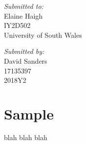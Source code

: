\documentclass[12pt]{article}
\begin{document}
\begin{titlepage}
  \begin{minipage}[t]{0.4\textwidth}
    \begin{flushleft} \large
      \textit{Submitted to:}\\
      Elaine Haigh\\IY2D502\\University of South Wales
    \end{flushleft}
  \end{minipage}
  \begin{minipage}[t]{0.4\textwidth}
    \begin{flushright} \large
      \textit{Submitted by:}\\
      David Sanders\\17135397\\2018Y2
    \end{flushright}
  \end{minipage}
\end{titlepage}



\tableofcontents
\pagebreak



\section{Sample}
blah blah blah
\end{document}
